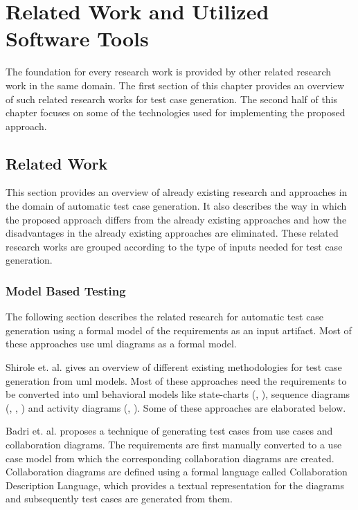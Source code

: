 
\chapter{Related Work and Utilized Software Tools}\label{relatedwork} 
The foundation for every research work is provided by other related research work in the same domain. The first section of this chapter provides an overview of such related research works for test case generation. The second half of this chapter focuses on some of the technologies used for implementing the proposed approach.

\section{Related Work}
This section provides an overview of already existing research and approaches in the domain of automatic test case generation. It also describes the way in which the proposed approach differs from the already existing approaches and how the disadvantages in the already existing approaches are eliminated. These related research works are grouped according to the type of inputs needed for test case generation. 
 
\subsection{Model Based Testing}
The following section describes the related research for automatic test case generation using a formal model of the requirements as an input artifact. Most of these approaches use \gls{uml} diagrams as a formal model.

Shirole et. al. \cite{shirole2013uml} gives an overview of different existing methodologies for test case generation from \gls{uml} models. Most of these approaches need the requirements to be converted into \gls{uml} behavioral models like state-charts (\cite{ryser1999scenario}, \cite{bandyopadhyay2009test}), sequence diagrams (\cite{nebut2003requirements}, \cite{linzhang2004generating}, \cite{briand2002uml}) and activity diagrams (\cite{nebut2006automatic}, \cite{nayak2012synthesis}).  Some of these approaches are elaborated below.

Badri et. al. \cite{badri2003use} proposes a technique of generating test cases from use cases and collaboration diagrams. The requirements are first manually converted to a use case model from which the corresponding collaboration diagrams are created. Collaboration diagrams are defined using a formal language called Collaboration Description Language, which provides a textual representation for the diagrams and subsequently test cases are generated from them.

